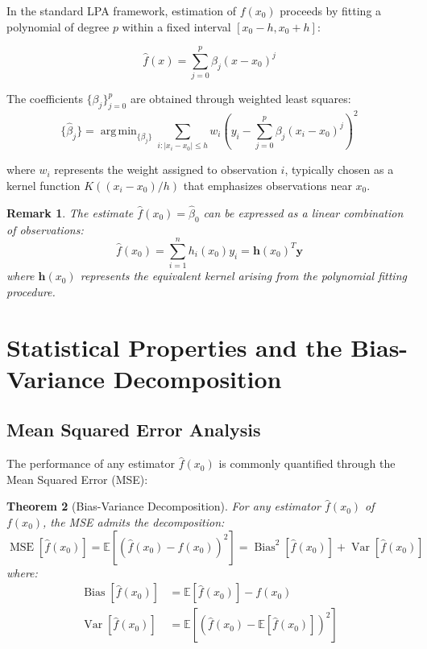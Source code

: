 \documentclass[12pt]{article}
\renewcommand{\vec}[1]{\mathbf{#1}}
\DeclareMathOperator{\Var}{Var}
\DeclareMathOperator{\Bias}{Bias}
\DeclareMathOperator{\MSE}{MSE}
\DeclareMathOperator{\argmin}{arg\,min}
\newcommand{\E}{\mathbb{E}}
\newtheorem{theorem}{Theorem}[section]
\newtheorem{remark}[theorem]{Remark}
\begin{document}
In the standard LPA framework, estimation of $f(x_0)$ proceeds by fitting a polynomial of degree $p$ within a fixed interval $[x_0 - h, x_0 + h]$:

\begin{equation}
    \hat{f}(x) = \sum_{j=0}^{p} \beta_j (x - x_0)^j
    \label{eq:lpa_polynomial}
\end{equation}

The coefficients $\{\beta_j\}_{j=0}^p$ are obtained through weighted least squares:
\begin{equation}
    \{\hat{\beta}_j\} = \argmin_{\{\beta_j\}} \sum_{i: |x_i - x_0| \leq h} w_i \left( y_i - \sum_{j=0}^{p} \beta_j (x_i - x_0)^j \right)^2
    \label{eq:wls}
\end{equation}

where $w_i$ represents the weight assigned to observation $i$, typically chosen as a kernel function $K((x_i - x_0)/h)$ that emphasizes observations near $x_0$.

\begin{remark}
    The estimate $\hat{f}(x_0) = \hat{\beta}_0$ can be expressed as a linear combination of observations:
    \begin{equation}
        \hat{f}(x_0) = \sum_{i=1}^{n} h_i(x_0) y_i = \vec{h}(x_0)^T \vec{y}
        \label{eq:linear_estimator}
    \end{equation}
    where $\vec{h}(x_0)$ represents the equivalent kernel arising from the polynomial fitting procedure.
\end{remark}

\newpage

\section{Statistical Properties and the Bias-Variance Decomposition}

\subsection{Mean Squared Error Analysis}

The performance of any estimator $\hat{f}(x_0)$ is commonly quantified through the Mean Squared Error (MSE):

\begin{theorem}[Bias-Variance Decomposition]
    \label{thm:bias_variance}
    For any estimator $\hat{f}(x_0)$ of $f(x_0)$, the MSE admits the decomposition:
    \begin{equation}
        \MSE[\hat{f}(x_0)] = \E[(\hat{f}(x_0) - f(x_0))^2] = \Bias^2[\hat{f}(x_0)] + \Var[\hat{f}(x_0)]
        \label{eq:mse_decomposition}
    \end{equation}
    where:
    \begin{align}
        \Bias[\hat{f}(x_0)] & = \E[\hat{f}(x_0)] - f(x_0)               \\
        \Var[\hat{f}(x_0)]  & = \E[(\hat{f}(x_0) - \E[\hat{f}(x_0)])^2]
    \end{align}
\end{theorem}
\end{document}
